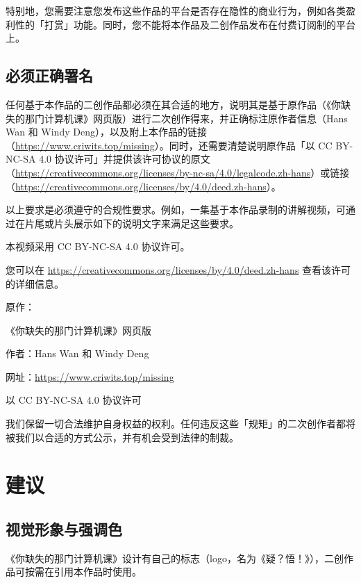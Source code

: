 特别地，您需要注意您发布这些作品的平台是否存在隐性的商业行为，例如各类盈利性的「打赏」功能。同时，您不能将本作品及二创作品发布在付费订阅制的平台上。

\subsection{必须正确署名}

任何基于本作品的二创作品都必须在其合适的地方，说明其是基于原作品（《你缺失的那门计算机课》网页版）进行二次创作得来，并正确标注原作者信息（Hans Wan 和 Windy Deng），以及附上本作品的链接（\url{https://www.criwits.top/missing}）。同时，还需要清楚说明原作品「以 CC BY-NC-SA 4.0 协议许可」并提供该许可协议的原文（\url{https://creativecommons.org/licenses/by-nc-sa/4.0/legalcode.zh-hans}）或链接（\url{https://creativecommons.org/licenses/by/4.0/deed.zh-hans}）。

以上要求是必须遵守的合规性要求。例如，一集基于本作品录制的讲解视频，可通过在片尾或片头展示如下的说明文字来满足这些要求。

\begin{quoting}
  本视频采用 CC BY-NC-SA 4.0 协议许可。\par
  您可以在 \url{https://creativecommons.org/licenses/by/4.0/deed.zh-hans} 查看该许可的详细信息。\par
  \phantom{六}\par
  原作：\par
  《你缺失的那门计算机课》网页版\par
  作者：Hans Wan 和 Windy Deng\par
  网址：\url{https://www.criwits.top/missing}\par
  以 CC BY-NC-SA 4.0 协议许可\par
\end{quoting}

我们保留一切合法维护自身权益的权利。任何违反这些「规矩」的二次创作者都将被我们以合适的方式公示，并有机会受到法律的制裁。

\section{建议}

\subsection{视觉形象与强调色}

《你缺失的那门计算机课》设计有自己的标志（logo，名为《疑？悟！》），二创作品可按需在引用本作品时使用。

